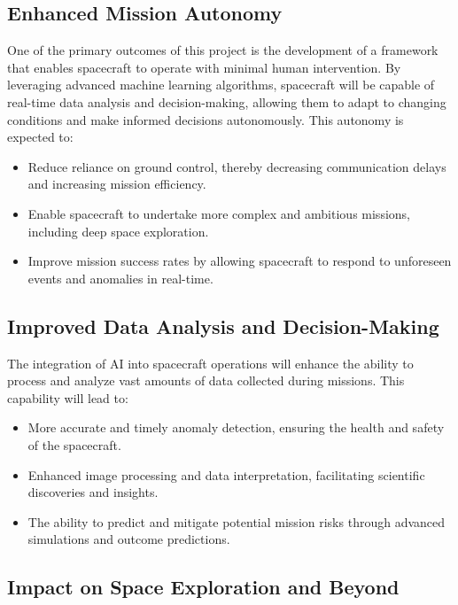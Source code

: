 \documentclass[a4paper,12pt]{article}
\begin{document}
\subsection{Enhanced Mission Autonomy}

One of the primary outcomes of this project is the development of a framework that enables spacecraft to operate with minimal human intervention. By leveraging advanced machine learning algorithms, spacecraft will be capable of real-time data analysis and decision-making, allowing them to adapt to changing conditions and make informed decisions autonomously. This autonomy is expected to:

\begin{itemize}
    \item Reduce reliance on ground control, thereby decreasing communication delays and increasing mission efficiency.
    \item Enable spacecraft to undertake more complex and ambitious missions, including deep space exploration.
    \item Improve mission success rates by allowing spacecraft to respond to unforeseen events and anomalies in real-time.
\end{itemize}

\subsection{Improved Data Analysis and Decision-Making}

The integration of AI into spacecraft operations will enhance the ability to process and analyze vast amounts of data collected during missions. This capability will lead to:

\begin{itemize}
    \item More accurate and timely anomaly detection, ensuring the health and safety of the spacecraft.
    \item Enhanced image processing and data interpretation, facilitating scientific discoveries and insights.
    \item The ability to predict and mitigate potential mission risks through advanced simulations and outcome predictions.
\end{itemize}

\subsection{Impact on Space Exploration and Beyond}
\end{document}
